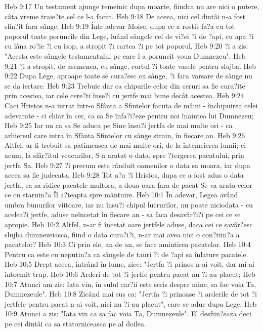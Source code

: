 Heb 9:17  Un testament ajunge temeinic dupa moarte, fiindca nu are nici o putere, câta vreme traie?te cel ce l-a facut.
Heb 9:18  De aceea, nici cel dintâi n-a fost sfin?it fara sânge.
Heb 9:19  Într-adevar Moise, dupa ce a rostit fa?a cu tot poporul toate poruncile din Lege, luând sângele cel de vi?ei ?i de ?api, cu apa ?i cu lâna ro?ie ?i cu isop, a stropit ?i cartea ?i pe tot poporul,
Heb 9:20  ?i a zis: "Acesta este sângele testamentului pe care l-a poruncit voua Dumnezeu".
Heb 9:21  ?i a stropit, de asemenea, cu sânge, cortul ?i toate vasele pentru slujba.
Heb 9:22  Dupa Lege, aproape toate se cura?esc cu sânge, ?i fara varsare de sânge nu se da iertare.
Heb 9:23  Trebuie dar ca chipurile celor din ceruri sa fie cura?ite prin acestea, iar cele cere?ti înse?i cu jertfe mai bune decât acestea.
Heb 9:24  Caci Hristos n-a intrat într-o Sfânta a Sfintelor facuta de mâini - închipuirea celei adevarate - ci chiar în cer, ca sa Se înfa?i?eze pentru noi înaintea lui Dumnezeu;
Heb 9:25  Iar nu ca sa Se aduca pe Sine însu?i jertfa de mai multe ori - ca arhiereul care intra în Sfânta Sfintelor cu sânge strain, în fiecare an.
Heb 9:26  Altfel, ar fi trebuit sa patimeasca de mai multe ori, de la întemeierea lumii; ci acum, la sfâr?itul veacurilor, S-a aratat o data, spre ?tergerea pacatului, prin jertfa Sa.
Heb 9:27  ?i precum este rânduit oamenilor o data sa moara, iar dupa aceea sa fie judecata,
Heb 9:28  Tot a?a ?i Hristos, dupa ce a fost adus o data jertfa, ca sa ridice pacatele multora, a doua oara fara de pacat Se va arata celor ce cu staruin?a Îl a?teapta spre mântuire.
Heb 10:1  În adevar, Legea având umbra bunurilor viitoare, iar nu însu?i chipul lucrurilor, nu poate niciodata - cu acelea?i jertfe, aduse neîncetat în fiecare an - sa faca desavâr?i?i pe cei ce se apropie.
Heb 10:2  Altfel, n-ar fi încetat oare jertfele aduse, daca cei ce savâr?esc slujba dumnezeiasca, fiind o data cura?i?i, n-ar mai avea nici o con?tiin?a a pacatelor?
Heb 10:3  Ci prin ele, an de an, se face amintirea pacatelor.
Heb 10:4  Pentru ca este cu neputin?a ca sângele de tauri ?i de ?api sa înlature pacatele.
Heb 10:5  Drept aceea, intrând în lume, zice: "Jertfa ?i prinos n-ai voit, dar mi-ai întocmit trup.
Heb 10:6  Arderi de tot ?i jertfe pentru pacat nu ?i-au placut;
Heb 10:7  Atunci am zis: Iata vin, în sulul car?ii este scris despre mine, sa fac voia Ta, Dumnezeule".
Heb 10:8  Zicând mai sus ca: "Jertfa ?i prinoase ?i arderile de tot ?i jertfele pentru pacat n-ai voit, nici nu ?i-au placut", care se aduc dupa Lege,
Heb 10:9  Atunci a zis: "Iata vin ca sa fac voia Ta, Dumnezeule". El desfiin?eaza deci pe cei dintâi ca sa statorniceasca pe al doilea.

